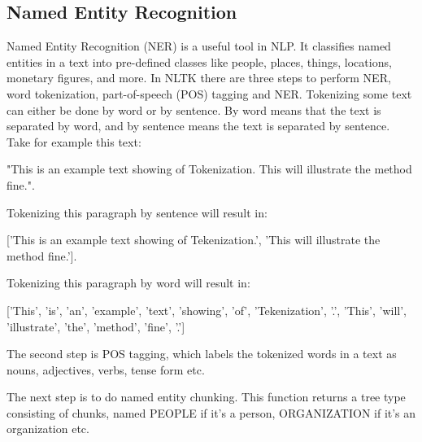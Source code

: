 \subsection{Named Entity Recognition}
Named Entity Recognition (NER) is a useful tool in NLP. It classifies named entities in a text into pre-defined classes like people, places, things, locations, monetary figures, and more. In NLTK there are three steps to perform NER, word tokenization, part-of-speech (POS) tagging and NER. 
Tokenizing some text can either be done by word or by sentence. By word means that the text is separated by word, and by sentence means the text is separated by sentence.
Take for example this text: 

"This is an example text showing of Tokenization. This will illustrate the method fine.". 

Tokenizing this paragraph by sentence will result in: 

['This is an example text showing of Tekenization.', 'This will illustrate the method fine.'].

Tokenizing this paragraph by word will result in: 

['This', 'is', 'an', 'example', 'text', 'showing', 'of', 'Tekenization', '.', 'This', 'will', 'illustrate', 'the', 'method', 'fine', '.']

The second step is POS tagging, which labels the tokenized words in a text as nouns, adjectives, verbs, tense form etc.

The next step is to do named entity chunking. This function returns a tree type consisting of chunks, named PEOPLE if it's a person, ORGANIZATION if it's an organization etc. 

\begin{comment}
#POS tag list:

#CC	coordinating conjunction
#CD	cardinal digit
#DT	determiner
#EX	existential there (like: "there is" ... think of it like "there exists")
#FW	foreign word
#IN	preposition/subordinating conjunction
#JJ	adjective	'big'
#JJR	adjective, comparative	'bigger'
#JJS	adjective, superlative	'biggest'
#LS	list marker	1)
#MD	modal	could, will
#NN	noun, singular 'desk'
#NNS	noun plural	'desks'
#NNP	proper noun, singular	'Harrison'
#NNPS	proper noun, plural	'Americans'
#PDT	predeterminer	'all the kids'
#POS	possessive ending	parent\'s
#PRP	personal pronoun	I, he, she
#PRP$	possessive pronoun	my, his, hers
#RB	adverb	very, silently,
#RBR	adverb, comparative	better
#RBS	adverb, superlative	best
#RP	particle	give up
#TO	to	go 'to' the store.
#UH	interjection	errrrrrrrm
#VB	verb, base form	take
#VBD	verb, past tense	took
#VBG	verb, gerund/present participle	taking
#VBN	verb, past participle	taken
#VBP	verb, sing. present, non-3d	take
#VBZ	verb, 3rd person sing. present	takes
#WDT	wh-determiner	which
#WP	wh-pronoun	who, what
#WP$	possessive wh-pronoun	whose
#WRB	wh-abverb	where, when
\end{comment}


